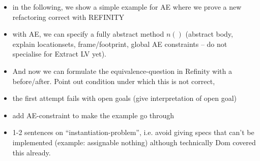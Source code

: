 \begin{itemize}
\item in the following, we show a simple example for AE where we prove a new refactoring correct with REFINITY
\item with AE, we can specify a fully abstract method $n()$ (abstract body, explain locationsets, frame/footprint, global AE constraints -- do not specialise for Extract LV yet).
\item And now we can formulate the equivalence-question in Refinity with a before/after. Point out condition under which this is not correct,
\item the first attempt fails with open goals (give interpretation of open goal)
\item add AE-constraint to make the example go through
\item 1-2 sentences on ``instantiation-problem'', i.e. avoid giving specs that can't be implemented (example: assignable nothing) although technically Dom covered this already.
\end{itemize}

